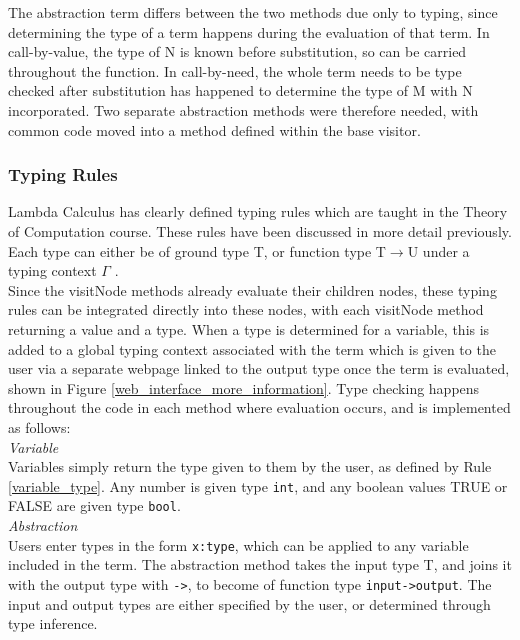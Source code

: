 \documentclass[a4paper,11pt]{report}
\begin{document}
The abstraction term differs between the two methods due only to typing, since determining the type of a term happens during the evaluation of that term. In call-by-value, the type of N is known before substitution, so can be carried throughout the function. In call-by-need, the whole term needs to be type checked after substitution has happened to determine the type of M with N incorporated. Two separate abstraction methods were therefore needed, with common code moved into a method defined within the base visitor.

\subsubsection{Typing Rules}

Lambda Calculus has clearly defined typing rules which are taught in the Theory of Computation course. These rules have been discussed in more detail previously. Each type can either be of ground type T, or function type T$\rightarrow$U under a typing context $\Gamma$ \cite{Hankin2004}.\\

Since the visitNode methods already evaluate their children nodes, these typing rules can be integrated directly into these nodes, with each visitNode method returning a value and a type. When a type is determined for a variable, this is added to a global typing context associated with the term which is given to the user via a separate webpage linked to the output type once the term is evaluated, shown in Figure \ref{web_interface_more_information}. Type checking happens throughout the code in each method where evaluation occurs, and is implemented as follows:\\

\textit{Variable}\\
Variables simply return the type given to them by the user, as defined by Rule \ref{variable_type}. Any number is given type \texttt{int}, and any boolean values TRUE or FALSE are given type \texttt{bool}.\\

\textit{Abstraction}\\
Users enter types in the form \texttt{x:type}, which can be applied to any variable included in the term. The abstraction method takes the input type T, and joins it with the output type with \texttt{->}, to become of function type \texttt{input->output}. The input and output types are either specified by the user, or determined through type inference.\\
\end{document}
